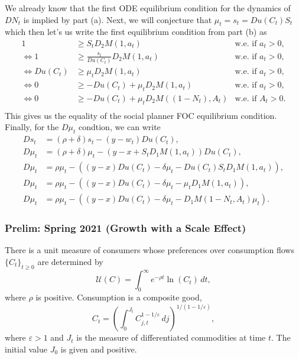\documentclass[11pt,english]{article}
\begin{document}
\begin{enumerate}
\begin{solution}
We already know that the first ODE equilibrium condition for the dynamics of $DN_t$ is implied by part (a). Next, we will conjecture that $\mu_t = s_t = Du(C_t)S_t$ which then let's us write the first equilibrium condition from part (b) as \begin{align*}
1 &\geq S_t D_2M(1, a_t) &\text{w.e. if } a_t > 0,\\
\Longleftrightarrow 1 &\geq \frac{s_t}{Du(C_t)}D_2M(1, a_t) &\text{w.e. if } a_t > 0,\\
\Longleftrightarrow Du(C_t) &\geq \mu_t D_2M(1, a_t) &\text{w.e. if } a_t > 0,\\
\Longleftrightarrow 0 &\geq - Du(C_t) + \mu_t D_2M(1, a_t) &\text{w.e. if } a_t > 0,\\
\Longleftrightarrow 0 &\geq - Du(C_t) + \mu_t D_2M((1 - N_t), A_t) &\text{w.e. if } A_t > 0.\\
\end{align*} This gives us the equality of the social planner FOC equilibrium condition. Finally, for the $D\mu_t$ condtion, we can write
\begin{align*}
Ds_t &= (\rho + \delta)s_t - (y - w_t)Du(C_t),\\
D\mu_t &= (\rho + \delta)\mu_t - (y - x + S_tD_1M(1, a_t))Du(C_t),\\
D\mu_t &= \rho\mu_t - ((y - x)Du(C_t) - \delta \mu_t - Du(C_t)S_tD_1M(1, a_t)),\\
D\mu_t &= \rho\mu_t - ((y - x)Du(C_t) - \delta \mu_t - \mu_tD_1M(1, a_t)),\\
D\mu_t &= \rho\mu_t - ((y - x)Du(C_t) - \delta \mu_t - D_1M(1 - N_t, A_t)\mu_t).
\end{align*}
    \end{solution}
\end{enumerate}

\subsubsection{Prelim: Spring 2021 (Growth with a Scale Effect)}

There is a unit measure of consumers whose preferences over consumption flows
$\{C_t\}_{t \geq 0}$ are determined by
\[
    \mathcal{U}(C) = \int_0^\infty e^{-\rho t} \ln(C_t)\, dt,
\]
where $\rho$ is positive. Consumption is a composite good,
\[
    C_t = \left(\int_0^{J_t} C_{j,t}^{1-1/\varepsilon}\, dj\right)^{1/(1-1/\varepsilon)},
\]
where $\varepsilon > 1$ and $J_t$ is the measure of differentiated commodities
at time $t$. The initial value $J_0$ is given and positive.
 
\end{document}
